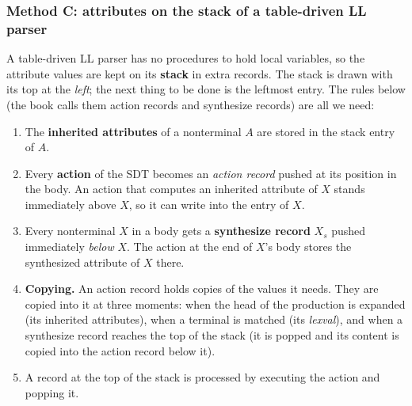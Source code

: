 \documentclass[11pt,a4paper]{article}
\begin{document}
\subsubsection{Method C: attributes on the stack of a table-driven LL parser}
A table-driven LL parser has no procedures to hold local variables, so the attribute values are kept on its \textbf{stack} in extra records. The stack is drawn with its top at the \emph{left}; the next thing to be done is the leftmost entry. The rules below (the book calls them action records and synthesize records) are all we need:
\begin{enumerate}[nosep]
\item The \textbf{inherited attributes} of a nonterminal $A$ are stored in the stack entry of $A$.
\item Every \textbf{action} of the SDT becomes an \emph{action record} pushed at its position in the body. An action that computes an inherited attribute of $X$ stands immediately above $X$, so it can write into the entry of $X$.
\item Every nonterminal $X$ in a body gets a \textbf{synthesize record} $X_s$ pushed immediately \emph{below} $X$. The action at the end of $X$'s body stores the synthesized attribute of $X$ there.
\item \textbf{Copying.} An action record holds copies of the values it needs. They are copied into it at three moments: when the head of the production is expanded (its inherited attributes), when a terminal is matched (its \textit{lexval}), and when a synthesize record reaches the top of the stack (it is popped and its content is copied into the action record below it).
\item A record at the top of the stack is processed by executing the action and popping it.
\end{enumerate}
\end{document}
